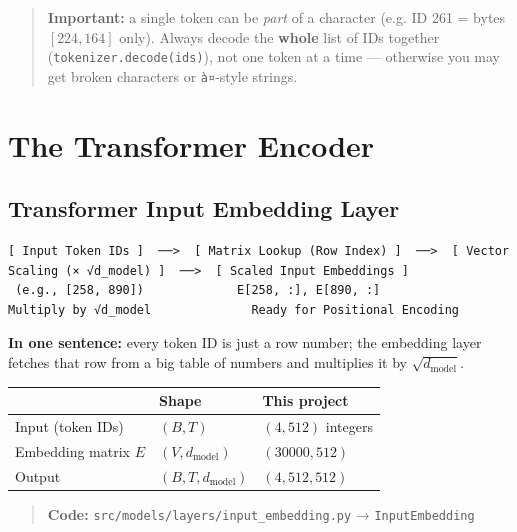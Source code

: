 \documentclass[11pt,a4paper,oneside]{report}
\begin{document}
\begin{quote}
\textbf{Important:} a single token can be \emph{part} of a character (e.g. ID 261 = bytes \([224, 164]\) only). Always decode the \textbf{whole} list of IDs together (\texttt{tokenizer.\allowbreak{}decode(ids)}), not one token at a time --- otherwise you may get broken characters or \texttt{à¤}-style strings.
\end{quote}



\part{The Transformer Encoder}


\chapter{Transformer Input Embedding Layer}\label{transformer-input-embedding-layer}

\begin{Verbatim}[fontsize=\tiny]
[ Input Token IDs ]  ──>  [ Matrix Lookup (Row Index) ]  ──>  [ Vector Scaling (× √d_model) ]  ──>  [ Scaled Input Embeddings ]
 (e.g., [258, 890])             E[258, :], E[890, :]                 Multiply by √d_model              Ready for Positional Encoding
\end{Verbatim}

\textbf{In one sentence:} every token ID is just a row number; the embedding layer fetches that row from a big table of numbers and multiplies it by \(\sqrt{d_{\text{model}}}\).

{\def\LTcaptype{none} %
\begin{longtable}[]{@{}lll@{}}
\toprule\noalign{}
& Shape & This project \\
\midrule\noalign{}
\endhead
\bottomrule\noalign{}
\endlastfoot
Input (token IDs) & \((B,\allowbreak T)\) & \((4,\allowbreak 512)\) integers \\
Embedding matrix \(E\) & \((V,\allowbreak d_{\text{model}})\) & \((30000,\allowbreak 512)\) \\
Output & \((B,\allowbreak T,\allowbreak d_{\text{model}})\) & \((4,\allowbreak 512,\allowbreak 512)\) \\
\end{longtable}
}

\begin{quote}
\textbf{Code:} \texttt{src/\allowbreak{}models/\allowbreak{}layers/\allowbreak{}input\_\allowbreak{}embedding.\allowbreak{}py} → \texttt{InputEmbedding}
\end{quote}
\end{document}
